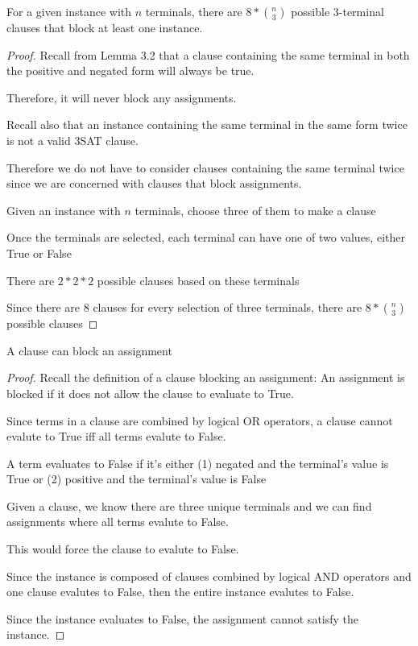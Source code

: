\documentclass[manuscript]{acmart}
\begin{document}
    \begin{lemma}
        For a given instance with $n$ terminals, there are $8 * {n \choose 3}$
        possible 3-terminal clauses that block at least one instance.
    \end{lemma}
    \begin{proof}
        Recall from Lemma 3.2 that a clause containing the same terminal in both
        the positive and negated form will always be true.

        Therefore, it will never block any assignments.

        Recall also that an instance containing the same terminal in the same
        form twice is not a valid 3SAT clause.

        Therefore we do not have to consider clauses containing the same terminal
        twice since we are concerned with clauses that block assignments.

        Given an instance with $n$ terminals, choose three of them to make a clause
        
        Once the terminals are selected, each terminal can have one of two values, either
        True or False

        There are $2 * 2 * 2$ possible clauses based on these terminals

        Since there are $8$ clauses for every selection of three terminals, there are
        $8 * {n \choose 3}$ possible clauses
    \end{proof}

    \begin{lemma}
        A clause can block an assignment    
    \end{lemma}
    \begin{proof}
        Recall the definition of a clause blocking an assignment:
        An assignment is blocked if it does not allow the clause to evaluate to True.

        Since terms in a clause are combined by logical OR operators, a 
        clause cannot evalute to True iff all terms evalute to False.

        A term evaluates to False if it's either (1) negated and the terminal's
        value is True or (2) positive and the terminal's value is False

        Given a clause, we know there are three unique terminals and we can
        find assignments where all terms evalute to False.

        This would force the clause to evalute to False.

        Since the instance is composed of clauses combined by logical AND operators 
        and one clause evalutes to False, then the entire instance evalutes to False.

        Since the instance evaluates to False, the assignment cannot satisfy
        the instance.

    \end{proof}
\end{document}
